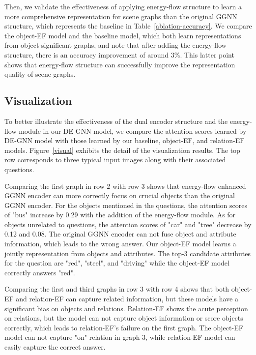 \documentclass[letterpaper]{article} %
\begin{document}
Then, we validate the effectiveness of applying energy-flow structure to learn a more comprehensive representation for scene graphs than the original GGNN structure, which represents the baseline in Table~\ref{ablation-accuracy}. We compare the object-EF model and the baseline model, which both learn representations from object-significant graphs, and note that after adding the energy-flow structure, there is an accuracy improvement of around 3\%. 
This latter point shows that energy-flow structure can successfully improve the representation quality of scene graphs. 


\subsection{Visualization}
To better illustrate the effectiveness of the dual encoder structure and the energy-flow module in our DE-GNN model, we compare the attention scores learned by DE-GNN model with those learned by our baseline, object-EF, and relation-EF models. 
Figure~\ref{visual} exhibits the detail of the visualization results. 
The top row corresponds to three typical input images along with their associated questions. 

Comparing the first graph in row 2 with row 3 shows that energy-flow enhanced GGNN encoder can more correctly focus on crucial objects than the original GGNN encoder. 
For the objects mentioned in the questions, the attention scores of "bus" increase by 0.29 with the addition of the energy-flow module.
As for objects unrelated to questions, the attention scores of "car" and "tree" decrease by 0.12 and 0.08. 
The original GGNN encoder can not fuse object and attribute information, which leads to the wrong answer. Our object-EF model learns a jointly representation from objects and attributes. 
The top-3 candidate attributes for the question are "red", "steel", and "driving" while the object-EF model correctly answers "red".

Comparing the first and third graphs in row 3 with row 4 shows that both object-EF and relation-EF can capture related information, but these models have a significant bias on objects and relations. Relation-EF shows the acute perception on relations, but the model can not capture object information or score objects correctly, which leads to relation-EF's failure on the first graph. The object-EF model can not capture "on" relation in graph 3, while relation-EF model can easily capture the correct answer.
\end{document}
